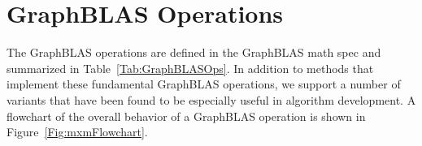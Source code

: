 \section{GraphBLAS Operations}
\label{Sec:Operations}


The GraphBLAS operations are defined in the GraphBLAS math spec and summarized in 
Table~\ref{Tab:GraphBLASOps}.   In addition to methods that implement these
fundamental GraphBLAS operations, we support a number of variants that have been 
found to be especially useful in algorithm development.
A flowchart of the overall behavior of a GraphBLAS operation is shown 
in Figure~\ref{Fig:mxmFlowchart}.


